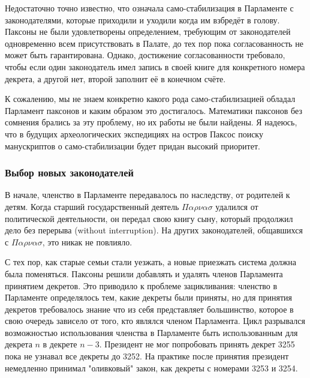 \documentclass[12pt, a4paper]{article} %
\begin{document}
Недостаточно точно известно, что означала само-стабилизация в Парламенте с законодателями, которые приходили и уходили когда им взбредёт в голову. Паксоны не были удовлетворены определением, требующим от законодателей одновременно всем присутствовать в Палате, до тех пор пока согласованность не может быть гарантирована. Однако, достижение согласованности требовало, чтобы если один законодатель имел запись в своей книге для конкретного номера декрета, а другой нет, второй заполнит её в конечном счёте.

К сожалению, мы не знаем конкретно какого рода само-стабили\-зацией обладал Парламент паксонов и каким образом это достигалось. Математики паксонов без сомнения брались за эту проблему, но их работы не были найдены. Я надеюсь, что в будущих археологических экспедициях на остров Паксос поиску манускриптов о само-стабилизации будет придан высокий приоритет.

\subsubsection{Выбор новых законодателей}\label{sec:choosinglegist}

В начале, членство в Парламенте передавалось по наследству, от родителей к детям. Когда старший государственный деятель $\Pi\alpha\rho\nu\alpha\sigma$ удалился от политической деятельности, он передал свою книгу сыну, который продолжил дело без перерыва (without interruption). На других законодателей, общавшихся с $\Pi\alpha\rho\nu\alpha\sigma$, это никак не повлияло.

С тех пор, как старые семьи стали уезжать, а новые приезжать система должна была поменяться. Паксоны решили добавлять и удалять членов Парламента принятием декретов. Это приводило к проблеме зацикливания: членство в Парламенте определялось тем, какие декреты были приняты, но для принятия декретов требовалось знание что из себя представляет большинство, которое в свою очередь зависело от того, кто являлся членом Парламента. Цикл разрывался возможностью использования членства в Парламенте быть использованным для декрета $n$ в декрете $n-3$. Президент не мог попробовать принять декрет 3255 пока не узнавал все декреты до 3252. На практике после принятия 
президент немедленно принимал "оливковый" закон, как декреты с номерами 3253 и 3254.
\end{document}

